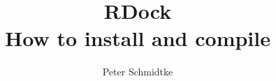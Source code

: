 \documentclass[9pt,a4paper]{article}
\begin{document}
\cleardoublepage

	\title{RDock\\ How to install and compile}
	\author{Peter Schmidtke}
	\maketitle
	   \thispagestyle{empty}
	\cleardoublepage

\setcounter{page}{1}


\end{document}

